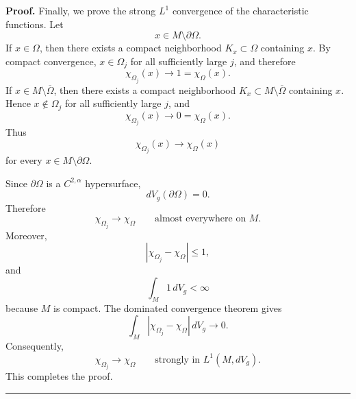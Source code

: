 \documentclass{article}
\newenvironment{proof}[1][Proof]{\textbf{#1.} }{\ \rule{0.5em}{0.5em}}
\begin{document}
\begin{proof}
Finally, we prove the strong $L^1$ convergence of the characteristic
functions. Let
\[
x\in M\setminus\partial\Omega.
\]
If $x\in\Omega$, then there exists a compact neighborhood
$K_x\subset\Omega$ containing $x$. By compact convergence,
$x\in\Omega_j$ for all sufficiently large $j$, and therefore
\[
\chi_{\Omega_j}(x)\longrightarrow1=\chi_\Omega(x).
\]
If
$x\in M\setminus\overline{\Omega}$, then there exists a compact
neighborhood
$K_x\subset M\setminus\overline{\Omega}$ containing $x$. Hence
$x\notin\Omega_j$ for all sufficiently large $j$, and
\[
\chi_{\Omega_j}(x)\longrightarrow0=\chi_\Omega(x).
\]
Thus
\[
\chi_{\Omega_j}(x)\longrightarrow\chi_\Omega(x)
\]
for every
$x\in M\setminus\partial\Omega$.

Since $\partial\Omega$ is a $C^{2,\alpha}$ hypersurface,
\[
dV_g(\partial\Omega)=0.
\]
Therefore
\[
\chi_{\Omega_j}\longrightarrow\chi_\Omega
\qquad\text{almost everywhere on }M.
\]
Moreover,
\[
|\chi_{\Omega_j}-\chi_\Omega|\le1,
\]
and
\[
\int_M1\,dV_g<\infty
\]
because $M$ is compact. The dominated convergence theorem gives
\[
\int_M
|\chi_{\Omega_j}-\chi_\Omega|\,dV_g
\longrightarrow0.
\]
Consequently,
\[
\chi_{\Omega_j}\longrightarrow\chi_\Omega
\qquad\text{strongly in }L^1(M,dV_g).
\]
This completes the proof.
\end{proof}

\end{document}

